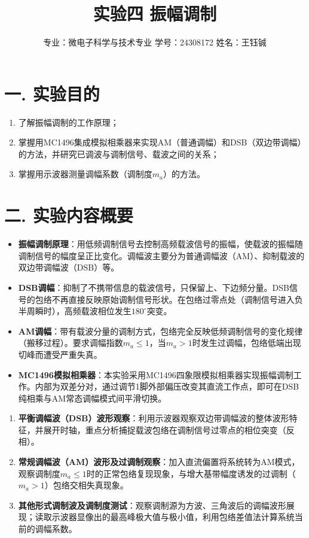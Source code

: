 \documentclass[12pt]{article}
\title{\Huge \textbf{实验四 \quad 振幅调制}}
\author{专业：微电子科学与技术专业 \quad 学号：24308172 \quad 姓名：王钰铖}
\date{}
\begin{document}
\maketitle

\section*{一. 实验目的}
\begin{enumerate}
    \item 了解振幅调制的工作原理；
    \item 掌握用MC1496集成模拟相乘器来实现AM（普通调幅）和DSB（双边带调幅）的方法，并研究已调波与调制信号、载波之间的关系；
    \item 掌握用示波器测量调幅系数（调制度$m_a$）的方法。
\end{enumerate}

\section*{二. 实验内容概要}

\vspace{1em}
\begin{itemize}
    \item \textbf{振幅调制原理}：用低频调制信号去控制高频载波信号的振幅，使载波的振幅随调制信号的幅度呈正比变化。调幅波主要分为普通调幅波（AM）、抑制载波的双边带调幅波（DSB）等。
    \item \textbf{DSB调幅}：抑制了不携带信息的载波信号，只保留上、下边频分量。DSB信号的包络不再直接反映原始调制信号形状。在包络过零点处（调制信号进入负半周瞬时），高频载波相位发生$180^\circ$突变。
    \item \textbf{AM调幅}：带有载波分量的调制方式，包络完全反映低频调制信号的变化规律（搬移过程）。要求调幅指数$m_a \le 1$，当$m_a > 1$时发生过调幅，包络低端出现切峰而遭受严重失真。
    \item \textbf{MC1496模拟相乘器}：本实验采用MC1496四象限模拟相乘器实现振幅调制工作。内部为双差分对，通过调节1脚外部偏压改变其直流工作点，即可在DSB纯相乘与AM常态调幅模式间平滑切换。
\end{itemize}

\vspace{1em}
\begin{enumerate}
    \item[(1)] \textbf{平衡调幅波（DSB）波形观察}：利用示波器观察双边带调幅波的整体波形特征，并展开时轴，重点分析捕捉载波包络在调制信号过零点的相位突变（反相）。
    \item[(2)] \textbf{常规调幅波（AM）波形及过调制观察}：加入直流偏置将系统转为AM模式，观察调制度$m_a \le 1$时的正常包络复现现象，与增大基带幅度诱发的过调制（$m_a > 1$）包络交相失真现象。
    \item[(3)] \textbf{其他形式调制波及调制度测试}：观察调制源为方波、三角波后的调幅波形展现；读取示波器显像出的最高峰极大值与极小值，利用包络差值法计算系统当前的调幅系数。
\end{enumerate}
\end{document}
